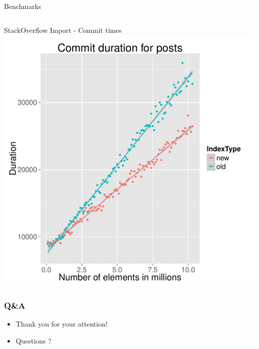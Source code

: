 \documentclass{beamer}
\begin{document}
\begin{section}{Benchmarks}
\begin{frame}
\begin{columns}[c]
        \end{columns}
    \end{frame}
    
    \begin{frame}{StackOverflow Import - Commit times}
        \includegraphics[scale=0.28]{images/SO_commit_duration.pdf}
    \end{frame}
  \end{section}



  \begin{frame}
    \frametitle{Q\&A}
      \begin{itemize}
        \item Thank you for your attention!
        \item Questions ?
      \end{itemize}
  \end{frame}
\end{document}
